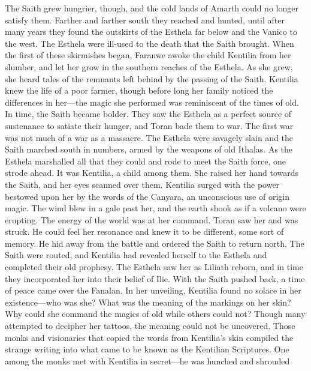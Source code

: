 \documentclass[smalldemyvopaper,11pt,twoside,onecolumn,openright,extrafontsizes]{memoir}
\begin{document}
{{The Saith grew hungrier, though, and the cold lands of Amarth could no longer satisfy them. Farther and farther south they reached and hunted, until after many years they found the outskirts of the Esthela far below and the Vanico to the west. The Esthela were ill-used to the death that the Saith brought. When the first of these skirmishes began, Faranwe awoke the child Kentilia from her slumber, and let her grow in the southern reaches of the Esthela. As she grew, she heard tales of the remnants left behind by the passing of the Saith. Kentilia knew the life of a poor farmer, though before long her family noticed the differences in her—the magic she performed was reminiscent of the times of old. In time, the Saith became bolder. They saw the Esthela as a perfect source of sustenance to satiate their hunger, and Toran bade them to war. The first war was not much of a war as a massacre. The Esthela were savagely slain and the Saith marched south in numbers, armed by the weapons of old Ithalas. As the Esthela marshalled all that they could and rode to meet the Saith force, one strode ahead. It was Kentilia, a child among them. She raised her hand towards the Saith, and her eyes scanned over them. Kentilia surged with the power bestowed upon her by the words of the Canyara, an unconscious use of origin magic. The wind blew in a gale past her, and the earth shook as if a volcano were erupting. The energy of the world was at her command. Toran saw her and was struck. He could feel her resonance and knew it to be different, some sort of memory. He hid away from the battle and ordered the Saith to return north. The Saith were routed, and Kentilia had revealed herself to the Esthela and completed their old prophesy. The Esthela saw her as Liliath reborn, and in time they incorporated her into their belief of Ilie. With the Saith pushed back, a time of peace came over the Fanalan. In her unveiling, Kentilia found no solace in her existence—who was she? What was the meaning of the markings on her skin? Why could she command the magics of old while others could not?
	Though many attempted to decipher her tattoos, the meaning could not be uncovered. Those monks and visionaries that copied the words from Kentilia’s skin compiled the strange writing into what came to be known as the Kentilian Scriptures. One among the monks met with Kentilia in secret—he was hunched and shrouded

}}
\end{document}
